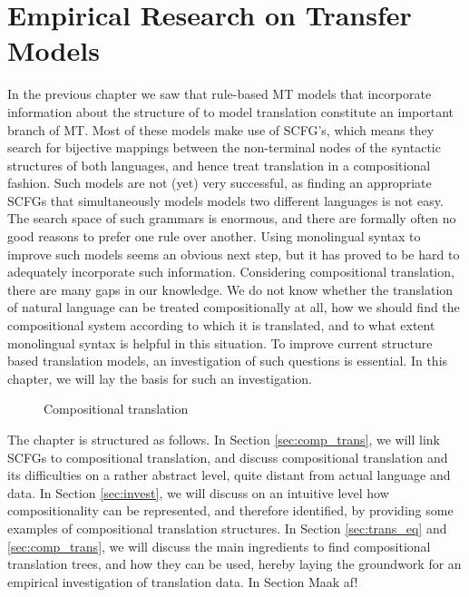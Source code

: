 \documentclass{report}
\begin{document}

\chapter{Empirical Research on Transfer Models}

In the previous chapter we saw that rule-based MT models that incorporate information about the structure of to model translation constitute an important branch of MT. Most of these models make use of SCFG's, which means they search  for bijective mappings between the non-terminal nodes of the syntactic structures of both languages, and hence treat translation in a compositional fashion. Such models are not (yet) very successful, as finding an appropriate SCFGs that simultaneously models models two different languages is not easy. The search space of such grammars is enormous, and there are formally often no good reasons to prefer one rule over another. Using monolingual syntax to improve such models seems an obvious next step, but it has proved to be hard to adequately incorporate such information. Considering compositional translation, there are many gaps in our knowledge. We do not know whether the translation of natural language can be treated compositionally at all, how we should find the compositional system according to which it is translated, and to what extent monolingual syntax is helpful in this situation. To improve current structure based translation models, an investigation of such questions is essential. In this chapter, we will lay the basis for such an investigation. 

\begin{figure}[!ht]
\begin{framed}
\centering

\end{framed}
\caption{Compositional translation}\label{fig:comptrans2}
\end{figure}

The chapter is structured as follows. In Section \ref{sec:comp_trans}, we will link SCFGs to compositional translation, and discuss compositional translation and its difficulties on a rather abstract level, quite distant from actual language and data. In Section \ref{sec:invest}, we will discuss on an intuitive level how compositionality can be represented, and therefore identified, by providing some examples of compositional translation structures. In Section \ref{sec:trans_eq} and \ref{sec:comp_trans}, we will discuss the main ingredients to find compositional translation trees, and how they can be used, hereby laying the groundwork for an empirical investigation of translation data. In Section
Maak af!
\end{document}
